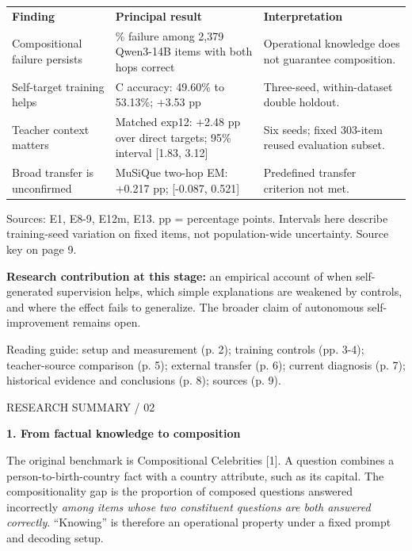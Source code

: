 \documentclass[10pt,a4paper]{article}
\newcommand{\reportheading}[1]{\par\vspace{5pt}{\color{teal}\bfseries\large #1}\par\vspace{2pt}}
\newcommand{\reporttitle}[1]{{\fontsize{20}{24}\selectfont\bfseries #1}\par\vspace{8pt}}
\begin{document}
{\small
\begin{tabular}{>{\raggedright\arraybackslash}p{}>{\raggedright\arraybackslash}p{}>{\raggedright\arraybackslash}p{}}
\rowcolor{navy}
\color{white}\bfseries Finding & \color{white}\bfseries Principal result & \color{white}\bfseries Interpretation \\
\rowcolor{pale}
Compositional failure persists & 33.80\% failure among 2,379 Qwen3-14B items with both hops correct & Operational knowledge does not guarantee composition. \\
Self-target training helps & C accuracy: 49.60\% to 53.13\%; +3.53 pp & Three-seed, within-dataset double holdout. \\
\rowcolor{pale}
Teacher context matters & Matched exp12: +2.48 pp over direct targets; 95\% interval [1.83, 3.12] & Six seeds; fixed 303-item reused evaluation subset. \\
Broad transfer is unconfirmed & MuSiQue two-hop EM: +0.217 pp; [-0.087, 0.521] & Predefined transfer criterion not met. \\
\end{tabular}
}\par\smallskip
{\small\color{muted} Sources: E1, E8-9, E12m, E13. pp = percentage points. Intervals here describe training-seed variation on fixed items, not population-wide uncertainty. Source key on page 9.\par}
\par\smallskip\noindent\colorbox{pale}{\parbox{\dimexpr\linewidth-2\fboxsep\relax}{\textbf{Research contribution at this stage:} an empirical account of when self-generated supervision helps, which simple explanations are weakened by controls, and where the effect fails to generalize. The broader claim of autonomous self-improvement remains open.}}\par\smallskip
{\small\color{muted} Reading guide: setup and measurement (p. 2); training controls (pp. 3-4); teacher-source comparison (p. 5); external transfer (p. 6); current diagnosis (p. 7); historical evidence and conclusions (p. 8); sources (p. 9).\par}

\clearpage
{\small\color{muted} RESEARCH SUMMARY / 02\par}
\reporttitle{1. From factual knowledge to composition}
\reportheading{Task and training method}
The original benchmark is Compositional Celebrities [1]. A question combines a person-to-birth-country fact with a country attribute, such as its capital. The compositionality gap is the proportion of composed questions answered incorrectly \textit{among items whose two constituent questions are both answered correctly}. ``Knowing'' is therefore an operational property under a fixed prompt and decoding setup.
\end{document}
